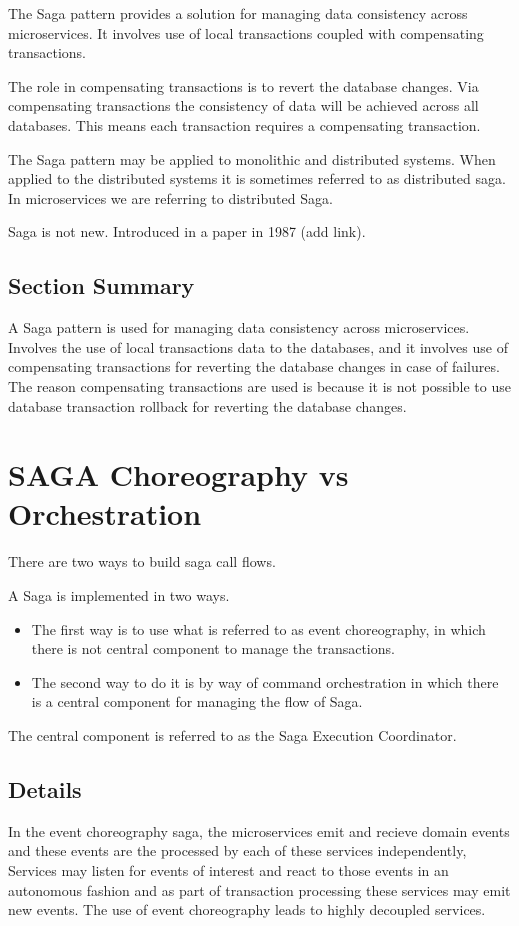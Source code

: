 The Saga pattern provides a solution for managing data consistency across microservices.
It involves use of local transactions coupled with compensating transactions.

The role in compensating transactions is to revert the database changes.
Via compensating transactions the consistency of data will be achieved across all databases.
This means each transaction requires a compensating transaction.

The Saga pattern may be applied to monolithic and distributed systems.
When applied to the distributed systems it is sometimes referred to as distributed saga.
In microservices we are referring to distributed Saga.

Saga is not new. Introduced in a paper in 1987 (add link).

\subsection{Section Summary}
A Saga pattern is used for managing data consistency across microservices.
Involves the use of local transactions data to the databases, and it involves use of compensating transactions for reverting the database changes in case of failures.
The reason compensating transactions are used is because it is not possible to use database transaction rollback for reverting the database changes.


\section{SAGA Choreography vs Orchestration}

There are two ways to build saga call flows.

A Saga is implemented in two ways.
\begin{itemize}
    \item The first way is to use what is referred to as event choreography, in which there is not central component to manage the transactions.
    \item The second way to do it is by way of command orchestration in which there is a central component for managing the flow of Saga.
\end{itemize}

The central component is referred to as the Saga Execution Coordinator.

\subsection{Details}
In the event choreography saga, the microservices emit and recieve domain events and these events are the processed by each of these services independently,
Services may listen for events of interest and react to those events in an autonomous fashion and as part of transaction processing these services may emit new events.
The use of event choreography leads to highly decoupled services.

